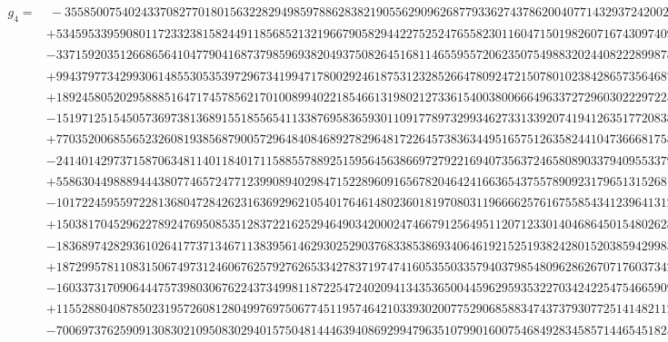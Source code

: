 \documentclass[preprint,12pt,authoryear]{elsarticle}
\begin{document}
{\tiny
\begin{align*}
  g_4=&~-3558500754024337082770180156322829498597886283821905562909626877933627437862004077143293724200219009927888896x_5^{25}\\
  &+53459533959080117233238158244911856852132196679058294422752524765582301160471501982607167430974092115094435584x_5^{24}\\
  &-337159203512668656410477904168737985969382049375082645168114655955720623507549883202440822289987871942813580672x_5^{23}\\
  &+994379773429930614855305353972967341994717800292461875312328526647809247215078010238428657356468774616503704256x_5^{22}\\
  &+189245805202958885164717457856217010089940221854661319802127336154003800666496337272960302229722564154334014816x_5^{21}\\
  &-15197125154505736973813689155185565411338769583659301109177897329934627331339207419412635177208389035828827853280x_5^{20}\\
  &+77035200685565232608193856879005729648408468927829648172264573836344951657512635824410473666817586520056592466384x_5^{19}\\
  &-241401429737158706348114011840171158855788925159564563866972792216940735637246580890337940955337976062511379408780x_5^{18}\\
  &+558630449888944438077465724771239908940298471522896091656782046424166365437557890923179651315268131895457834737840x_5^{17}\\
  &-1017224595597228136804728426231636929621054017646148023601819708031196666257616755854341239641312660582786669412250x_5^{16}\\
  &+1503817045296227892476950853512837221625294649034200024746679125649511207123301404686450154802628965251836163156638x_5^{15}\\
  &-1836897428293610264177371346711383956146293025290376833853869340646192152519382428015203859429983377866327285534440x_5^{14}\\
  &+1872995781108315067497312460676257927626533427837197474160535503357940379854809628626707176037342237011018857587474x_5^{13}\\
  &-1603373170906444757398030676224373499811872254724020941343536500445962959353227034242254754665909779095643373418578x_5^{12}\\
  &+1155288040878502319572608128049976975067745119574642103393020077529068588347437379307725141482112392993781461014925x_5^{11}\\
  &-700697376259091308302109508302940157504814446394086929947963510799016007546849283458571446545182585269186009462998x_5^{10}\\

\end{align*}}
\end{document}
